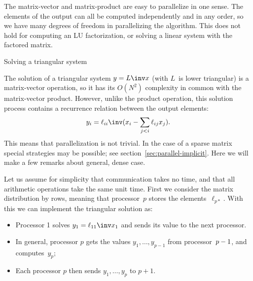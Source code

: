 
The matrix-vector and matrix-product are easy to parallelize in one sense.
The elements of the output can all be computed independently and in any order,
so we have many degrees of freedom in parallelizing the algorithm.
This does not hold for computing an LU factorization, or solving a linear system
with the factored matrix.

 {Solving a triangular system}

The solution of a triangular system $y=L\inv x$ (with $L$~is lower triangular)
is a matrix-vector operation, so
it has its $O(N^2)$ complexity in common with the matrix-vector product.
However, unlike the product operation, this solution process contains a recurrence
relation between the output elements: 
\[ y_{i} = \ell_{ii}\inv ( x_i-\sum_{j<i} \ell_{ij}x_j ). \]
This means that parallelization is not trivial.
In the case of a sparse matrix special strategies may be possible; see section~\ref{sec:parallel-implicit}.
Here we will make a few remarks about general, dense case.

Let us assume for simplicity that communication takes no time, and
that all arithmetic operations take the same unit time.
First we consider the matrix distribution by rows,
meaning that processor~$p$ stores the elements~$\ell_{p*}$.
With this we can implement the triangular solution as:
\begin{itemize}
\item Processor 1 solves $y_1=\ell_{11}\inv x_1$ and sends its value to the next processor.
\item In general, processor $p$ gets the values $y_1,\ldots,y_{p-1}$
  from processor~$p-\nobreak1$, and computes~$y_p$;
\item Each processor $p$ then sends $y_1,\ldots,y_p$ to $p+1$.
\end{itemize}

